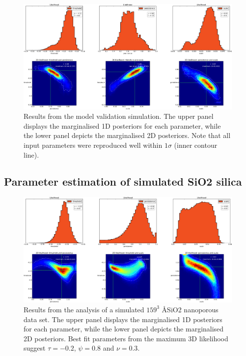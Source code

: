 \documentclass[aps,pre,twocolumn,letterpaper,floatfix,showpacs]{revtex4}
\begin{document}
\begin{figure}
\includegraphics[width=.99\textwidth]{mock_data_results_pts.png}
\caption{Results from the model validation simulation. The upper panel displays the marginalised 1D posteriors for each parameter, while the lower panel depicts the marginalised 2D posteriors. Note that all input parameters were reproduced well within $1\sigma$ (inner contour line).}
\label{fig:mockdataresults_pts}
\end{figure}

\subsection{Parameter estimation of simulated SiO2 silica}
\begin{figure}
\includegraphics[width=.99\textwidth]{results_porous_full.png}
\caption{Results from the analysis of a simulated $159^3$ \AA SiO2 nanoporous data set. The upper panel displays the marginalised 1D posteriors for each parameter, while the lower panel depicts the marginalised 2D posteriors. Best fit parameters from the maximum 3D likelihood suggest $\tau=-0.2$, $\psi=0.8$ and $\nu=0.3$.}
\label{fig:porous_results1}
\end{figure}
\end{document}
